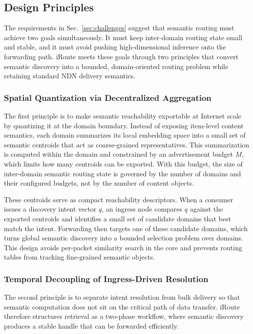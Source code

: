 \documentclass[conference]{IEEEtran}
\newcommand{\sysname}{iRoute}
\begin{document}
\subsection{Design Principles}
\label{sec:design_principles}

The requirements in Sec.~\ref{sec:challenges} suggest that semantic routing must achieve two goals simultaneously.
It must keep inter-domain routing state small and stable, and it must avoid pushing high-dimensional inference onto the forwarding path.
\sysname{} meets these goals through two principles that convert semantic discovery into a bounded, domain-oriented routing problem while retaining standard NDN delivery semantics.

\subsubsection{Spatial Quantization via Decentralized Aggregation}
The first principle is to make semantic reachability exportable at Internet scale by quantizing it at the domain boundary. Instead of exposing item-level content semantics, each domain summarizes its local embedding space into a small set of semantic centroids that act as coarse-grained representatives. This summarization is computed within the domain and constrained by an advertisement budget $M$, which limits how many centroids can be exported. With this budget, the size of inter-domain semantic routing state is governed by the number of domains and their configured budgets, not by the number of content objects.

These centroids serve as compact reachability descriptors. When a consumer issues a discovery intent vector $q$, an ingress node compares $q$ against the exported centroids and identifies a small set of candidate domains that best match the intent. Forwarding then targets one of these candidate domains, which turns global semantic discovery into a bounded selection problem over domains. This design avoids per-packet similarity search in the core and prevents routing tables from tracking fine-grained semantic objects.

\subsubsection{Temporal Decoupling of Ingress-Driven Resolution}
The second principle is to separate intent resolution from bulk delivery so that semantic computation does not sit on the critical path of data transfer. \sysname{} therefore structures retrieval as a two-phase workflow, where semantic discovery produces a stable handle that can be forwarded efficiently.
\end{document}
